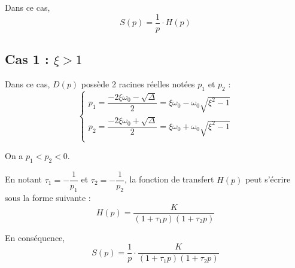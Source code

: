 \documentclass[11pt,oneside]{article}
\begin{document}
Dans ce cas, 
$$
S(p)=\dfrac{1}{p}\cdot H(p)
$$
\subsection{Cas 1 : $\xi > 1$}



Dans ce cas, $D(p)$ possède 2 racines réelles notées $p_1$ et $p_2$ :
$$
\left\{
\begin{array}{l}
p_1 =
\dfrac{-2\xi\omega_0-\sqrt{\Delta}}{2}=\xi\omega_0-\omega_0\sqrt{\xi^2-1}\\ 
p_2 =
\dfrac{-2\xi\omega_0+\sqrt{\Delta}}{2}=\xi\omega_0+\omega_0\sqrt{\xi^2-1}\\ 
\end{array}
\right.
$$

On a $p_1<p_2<0$.

En notant $\tau_1=-\dfrac{1}{p_1}$ et $\tau_2=-\dfrac{1}{p_2}$, la fonction de
transfert $H(p)$ peut s'écrire sous la forme suivante :  
$$
H(p)=\dfrac{K}{\left(1+ \tau_1 p \right)\left(1+ \tau_2 p  \right)}
$$

En conséquence, 
$$
S(p)=\dfrac{1}{p}\cdot\dfrac{K}{\left(1+ \tau_1 p \right)\left(1+ \tau_2 p 
\right)} 
$$
\end{document}
